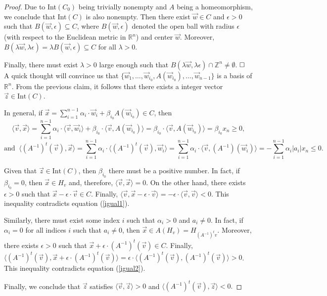 \documentclass[12pt]{article}
\theoremstyle{definition}
\begin{document}
\begin{proof}
    Due to Int$(C_0)$ being trivially nonempty and $A$ being a homeomorphism, we conclude that Int$(C)$ is also nonempty. Then there exist $\vec{w}\in C$ and $\epsilon>0$ such that $B(\vec{w},\epsilon)\subseteq C$, where $B(\vec{w},\epsilon)$ denoted the open ball with radius $\epsilon$ (with respect to the Euclidean metric in $\mathbb{R}^n$) and center $\vec{w}$. Moreover, $B(\lambda\vec{w},\lambda\epsilon)=\lambda B(\vec{w},\epsilon)\subseteq C$ for all $\lambda>0$.
    
    Finally, there must exist $\lambda>0$ large enough such that $B(\lambda\vec{w},\lambda\epsilon)\cap \mathbb{Z}^n\neq \emptyset$. $\hfill\square$\\

A quick thought will convince us that $\{\vec{w}_1,\dots, \vec{w}_{i_0},A(\vec{w}_{i_0}),\dots, \vec{w}_{n-1}\}$ is a basis of $\mathbb{R}^n$. From the previous claim, it follows that there exists a integer vector $\vec{z}\in \text{Int}(C)$.

In general, if $\vec{x}=\sum_{i=1}^{n-1}\alpha_i\cdot\vec{w}_i  + \beta_{i_0}A(\vec{w}_{i_0})\in C$, then
\begin{equation}   
\label{igual1}
\langle\vec{v},\vec{x}\rangle=\sum_{i=1}^{n-1}\alpha_{i}\cdot\langle\vec{v},\vec{w}_i \rangle + \beta_{i_0}\cdot \langle \vec{v},A(\vec{w}_{i_0})\rangle=\beta_{i_0}\cdot \langle \vec{v},A(\vec{w}_{i_0})\rangle=\beta_{i_0}x_n\geq 0,
\end{equation}
\begin{equation}
\label{igual2}
\text{and }\ \langle (A^{-1})^t(\vec{v}),\vec{x}\rangle=\sum_{i=1}^{n-1}\alpha_i\cdot\langle (A^{-1})^t(\vec{v}),\vec{w}_i\rangle=\sum_{i=1}^{n-1}\alpha_i\cdot\langle \vec{v},(A^{-1})(\vec{w}_i)\rangle=-\sum_{i=1}^{n-1}\alpha_i|a_{i}|x_n\leq 0.    
\end{equation}

Given that $\vec{z}\in \text{Int}(C)$, then $\beta_{i_0}$ there must be a positive number. In fact, if $\beta_{i_0}=0$, then $\vec{x}\in H_v$ and, therefore,  $\langle\vec{v},\vec{x}\rangle=0$. On the other hand, there exists $\epsilon>0$ such that $\vec{x}-\epsilon\cdot\vec{v}\in C$. Finally, $\langle\vec{v},\vec{x}-\epsilon\cdot\vec{v}\rangle=-\epsilon\cdot\langle\vec{v},\vec{v}\rangle<0$. This inequality contradicts equation (\ref{igual1}).

Similarly, there must exist some index $i$ such that $\alpha_i> 0$ and $a_i\neq 0$. In fact, if $\alpha_i=0$ for all indices $i$ such that $a_i\neq 0$, then $\vec{x}\in A(H_v)=H_{(A^{-1})^tv}$. Moreover, there exists $\epsilon>0$ such that $\vec{x}+\epsilon\cdot(A^{-1})^t(\vec{v})\in C$. Finally, $\langle (A^{-1})^t(\vec{v}), \vec{x}+ \epsilon\cdot(A^{-1})^t(\vec{v})\rangle=\epsilon\cdot\langle (A^{-1})^t(\vec{v}), (A^{-1})^t(\vec{v})\rangle>0$. This inequality contradicts equation (\ref{igual2}).

Finally, we conclude that $\vec{z}$ satisfies $\langle\vec{v},\vec{z}\rangle>0$ and $\langle(A^{-1})^t(\vec{v}),\vec{z}\rangle<0.$ 
\end{proof}
\end{document}
